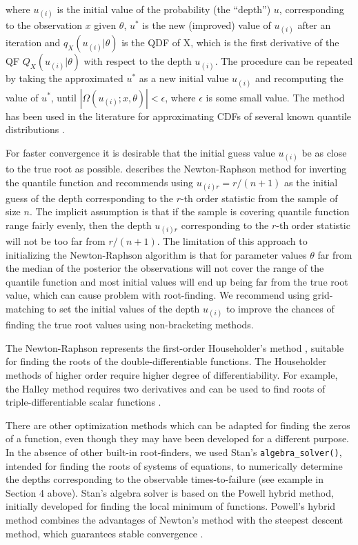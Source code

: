\documentclass[
  12pt,
]{article}
\begin{document}
where \(u_{(i)}\) is the initial value of the probability (the ``depth'') \(u\), corresponding to the observation \(x\) given \(\theta\), \(u^*\) is the new (improved) value of \(u_{(i)}\) after an iteration and \(q_X(u_{(i)}|\theta)\) is the QDF of X, which is the first derivative of the QF \(Q_X(u_{(i)}|\theta)\) with respect to the depth \(u_{(i)}\). The procedure can be repeated by taking the approximated \(u^*\) as a new initial value \(u_{(i)}\) and recomputing the value of \(u^*\), until \(|\Omega(u_{(i)};x,\theta)|< \epsilon\), where \(\epsilon\) is some small value. The method has been used in the literature for approximating CDFs of several known quantile distributions \citetext{\citealp[see p.99 in][]{gilchrist2000StatisticalModellingQuantile}; \citealp[p.345 in][]{nair2013QuantileBasedReliabilityAnalysis}}.

For faster convergence it is desirable that the initial guess value \(u_{(i)}\) be as close to the true root as possible. \citet{gilchrist2000StatisticalModellingQuantile} describes the Newton-Raphson method for inverting the quantile function and recommends using \(u_{(i)r}=r/(n+1)\) as the initial guess of the depth corresponding to the \(r\)-th order statistic from the sample of size \(n\). The implicit assumption is that if the sample is covering quantile function range fairly evenly, then the depth \(u_{(i)r}\) corresponding to the \(r\)-th order statistic will not be too far from \(r/(n+1)\). The limitation of this approach to initializing the Newton-Raphson algorithm is that for parameter values \(\theta\) far from the median of the posterior the observations will not cover the range of the quantile function and most initial values will end up being far from the true root value, which can cause problem with root-finding. We recommend using grid-matching to set the initial values of the depth \(u_{(i)}\) to improve the chances of finding the true root values using non-bracketing methods.

The Newton-Raphson represents the first-order Householder's method \citep{householder1970NumericalTreatmentSingle}, suitable for finding the roots of the double-differentiable functions. The Householder methods of higher order require higher degree of differentiability. For example, the Halley method requires two derivatives and can be used to find roots of triple-differentiable scalar functions \citep{scavo1995GeometryHalleyMethod}.

There are other optimization methods which can be adapted for finding the zeros of a function, even though they may have been developed for a different purpose. In the absence of other built-in root-finders, we used Stan's \texttt{algebra\_solver()}, intended for finding the roots of systems of equations, to numerically determine the depths corresponding to the observable times-to-failure (see example in Section 4 above). Stan's algebra solver is based on the Powell hybrid method, initially developed for finding the local minimum of functions. Powell's hybrid method combines the advantages of Newton's method with the steepest descent method, which guarantees stable convergence \citep{powell1970HybridMethodNonlinear}.
\end{document}
